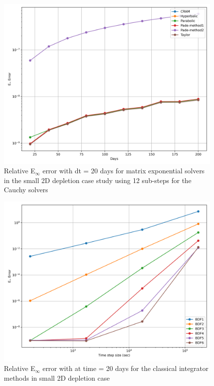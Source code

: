\begin{figure}[p]
    \centering
    \includegraphics[width=5in]{images/chapter-5/caseStudies/small2DDepletion/msrSmall2DDepletionEinfErrorerrorSteps12.png}
    \caption{Relative E$_{\infty}$ error with dt = 20 days for matrix exponential solvers in the small 2D depletion case study using 12 sub-steps for the Cauchy solvers}
    \label{fig:small_2D_depletion_Einf_steps12}
\end{figure}

\clearpage

\begin{figure}[p]
    \centering
    \includegraphics[width=5in]{images/chapter-5/caseStudies/small2DDepletion/msrSmall2DDepletionEinfErrorerrorIntegrators.png}
    \caption{Relative E$_{\infty}$ error with at time = 20 days for the classical integrator methods in small 2D depletion case}
    \label{fig:small_2D_depletion_Einf_integrators}
\end{figure}

